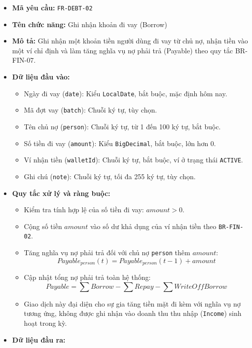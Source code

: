 \documentclass[11pt,a4paper]{article}
\providecommand{\tightlist}{
  \setlength{\itemsep}{0pt}\setlength{\parskip}{0pt}}
\begin{document}
\begin{itemize}
\tightlist
\item
  \textbf{Mã yêu cầu:} \texttt{FR-DEBT-02}
\item
  \textbf{Tên chức năng:} Ghi nhận khoản đi vay (Borrow)
\item
  \textbf{Mô tả:} Ghi nhận một khoản tiền người dùng đi vay từ chủ nợ,
  nhận tiền vào một ví chỉ định và làm tăng nghĩa vụ nợ phải trả
  (Payable) theo quy tắc BR-FIN-07.
\item
  \textbf{Dữ liệu đầu vào:}

  \begin{itemize}
  \tightlist
  \item
    Ngày đi vay (\texttt{date}): Kiểu \texttt{LocalDate}, bắt buộc, mặc
    định hôm nay.
  \item
    Mã đợt vay (\texttt{batch}): Chuỗi ký tự, tùy chọn.
  \item
    Tên chủ nợ (\texttt{person}): Chuỗi ký tự, từ 1 đến 100 ký tự, bắt
    buộc.
  \item
    Số tiền đi vay (\texttt{amount}): Kiểu \texttt{BigDecimal}, bắt
    buộc, lớn hơn 0.
  \item
    Ví nhận tiền (\texttt{walletId}): Chuỗi ký tự, bắt buộc, ví ở trạng
    thái \texttt{ACTIVE}.
  \item
    Ghi chú (\texttt{note}): Chuỗi ký tự, tối đa 255 ký tự, tùy chọn.
  \end{itemize}
\item
  \textbf{Quy tắc xử lý và ràng buộc:}

  \begin{itemize}
  \tightlist
  \item
    Kiểm tra tính hợp lệ của số tiền đi vay: \(amount > 0\).
  \item
    Cộng số tiền \(amount\) vào số dư khả dụng của ví nhận tiền theo
    \texttt{BR-FIN-02}.
  \item
    Tăng nghĩa vụ nợ phải trả đối với chủ nợ \texttt{person} thêm
    \(amount\): \[Payable_{person}(t) = Payable_{person}(t-1) + amount\]
  \item
    Cập nhật tổng nợ phải trả toàn hệ thống:
    \[
    Payable = \sum Borrow - \sum Repay - \sum WriteOffBorrow
    \]
  \item
    Giao dịch này đại diện cho sự gia tăng tiền mặt đi kèm với nghĩa vụ
    nợ tương ứng, không được ghi nhận vào doanh thu thu nhập
    (\texttt{Income}) sinh hoạt trong kỳ.
  \end{itemize}
\item
  \textbf{Dữ liệu đầu ra:}


\end{itemize}
\end{document}
